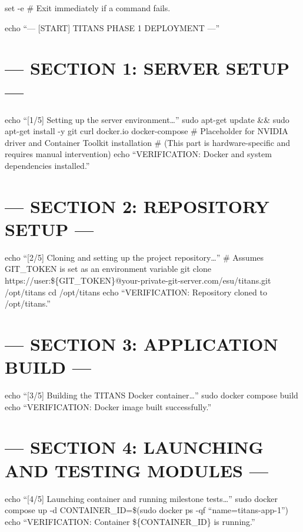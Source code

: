 \documentclass[letterpaper,twocolumn]{article}
\begin{document}
set -e \# Exit immediately if a command fails.

echo ``--- {[}START{]} TITANS PHASE 1 DEPLOYMENT ---''

\hypertarget{section-1-server-setup}{%
\section{--- SECTION 1: SERVER SETUP ---}\label{section-1-server-setup}}

echo ``{[}1/5{]} Setting up the server environment\ldots{}'' sudo
apt-get update \&\& sudo apt-get install -y git curl docker.io
docker-compose \# Placeholder for NVIDIA driver and Container Toolkit
installation \# (This part is hardware-specific and requires manual
intervention) echo ``VERIFICATION: Docker and system dependencies
installed.''

\hypertarget{section-2-repository-setup}{%
\section{--- SECTION 2: REPOSITORY SETUP
---}\label{section-2-repository-setup}}

echo ``{[}2/5{]} Cloning and setting up the project repository\ldots{}''
\# Assumes GIT\_TOKEN is set as an environment variable git clone
https://user:\$\{GIT\_TOKEN\}@your-private-git-server.com/esu/titans.git
/opt/titans cd /opt/titans echo ``VERIFICATION: Repository cloned to
/opt/titans.''

\hypertarget{section-3-application-build}{%
\section{--- SECTION 3: APPLICATION BUILD
---}\label{section-3-application-build}}

echo ``{[}3/5{]} Building the TITANS Docker container\ldots{}'' sudo
docker compose build echo ``VERIFICATION: Docker image built
successfully.''

\hypertarget{section-4-launching-and-testing-modules}{%
\section{--- SECTION 4: LAUNCHING AND TESTING MODULES
---}\label{section-4-launching-and-testing-modules}}

echo ``{[}4/5{]} Launching container and running milestone
tests\ldots{}'' sudo docker compose up -d CONTAINER\_ID=\$(sudo docker
ps -qf ``name=titans-app-1'') echo ``VERIFICATION: Container
\$\{CONTAINER\_ID\} is running.''
\end{document}
